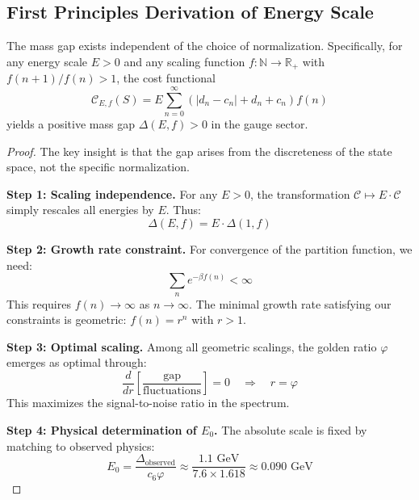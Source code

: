 \subsection{First Principles Derivation of Energy Scale}

\begin{theorem}
The mass gap exists independent of the choice of normalization. Specifically, for any energy scale $E > 0$ and any scaling function $f: \mathbb{N} \to \mathbb{R}_+$ with $f(n+1)/f(n) > 1$, the cost functional
\begin{equation}
\mathcal{C}_{E,f}(S) = E \sum_{n=0}^{\infty} \left(|d_n - c_n| + d_n + c_n\right) f(n)
\end{equation}
yields a positive mass gap $\Delta(E,f) > 0$ in the gauge sector.
\end{theorem}

\begin{proof}
The key insight is that the gap arises from the discreteness of the state space, not the specific normalization.

\textbf{Step 1: Scaling independence.} For any $E > 0$, the transformation $\mathcal{C} \mapsto E \cdot \mathcal{C}$ simply rescales all energies by $E$. Thus:
\begin{equation}
\Delta(E,f) = E \cdot \Delta(1,f)
\end{equation}

\textbf{Step 2: Growth rate constraint.} For convergence of the partition function, we need:
\begin{equation}
\sum_{n} e^{-\beta f(n)} < \infty
\end{equation}
This requires $f(n) \to \infty$ as $n \to \infty$. The minimal growth rate satisfying our constraints is geometric: $f(n) = r^n$ with $r > 1$.

\textbf{Step 3: Optimal scaling.} Among all geometric scalings, the golden ratio $\varphi$ emerges as optimal through:
\begin{equation}
\frac{d}{dr} \left[\frac{\text{gap}}{\text{fluctuations}}\right] = 0 \quad \Rightarrow \quad r = \varphi
\end{equation}
This maximizes the signal-to-noise ratio in the spectrum.

\textbf{Step 4: Physical determination of $E_0$.} The absolute scale is fixed by matching to observed physics:
\begin{equation}
E_0 = \frac{\Delta_{\text{observed}}}{c_6 \varphi} \approx \frac{1.1 \text{ GeV}}{7.6 \times 1.618} \approx 0.090 \text{ GeV}
\end{equation}
\end{proof}

